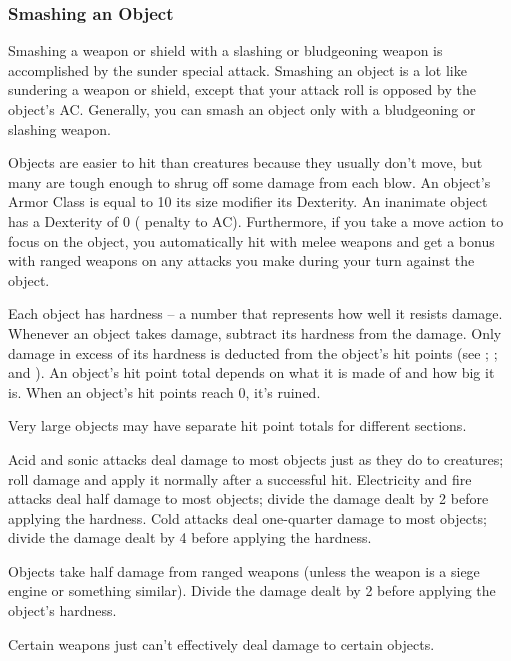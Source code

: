 \subsubsection{Smashing an Object}
Smashing a weapon or shield with a slashing or bludgeoning weapon is accomplished by the sunder special attack. Smashing an object is a lot like sundering a weapon or shield, except that your attack roll is opposed by the object's AC. Generally, you can smash an object only with a bludgeoning or slashing weapon.

 Objects are easier to hit than creatures because they usually don't move, but many are tough enough to shrug off some damage from each blow. An object's Armor Class is equal to 10 \add its size modifier \add its Dexterity. An inanimate object has a Dexterity of 0 ( penalty to AC). Furthermore, if you take a move action to focus on the object, you automatically hit with melee weapons and get a  bonus with ranged weapons on any attacks you make during your turn against the object.

 Each object has hardness -- a number that represents how well it resists damage. Whenever an object takes damage, subtract its hardness from the damage. Only damage in excess of its hardness is deducted from the object's hit points (see ; ; and ).
 An object's hit point total depends on what it is made of and how big it is. When an object's hit points reach 0, it's ruined.

Very large objects may have separate hit point totals for different sections.

 Acid and sonic attacks deal damage to most objects just as they do to creatures; roll damage and apply it normally after a successful hit. Electricity and fire attacks deal half damage to most objects; divide the damage dealt by 2 before applying the hardness. Cold attacks deal one-quarter damage to most objects; divide the damage dealt by 4 before applying the hardness.

 Objects take half damage from ranged weapons (unless the weapon is a siege engine or something similar). Divide the damage dealt by 2 before applying the object's hardness.

 Certain weapons just can't effectively deal damage to certain objects.

